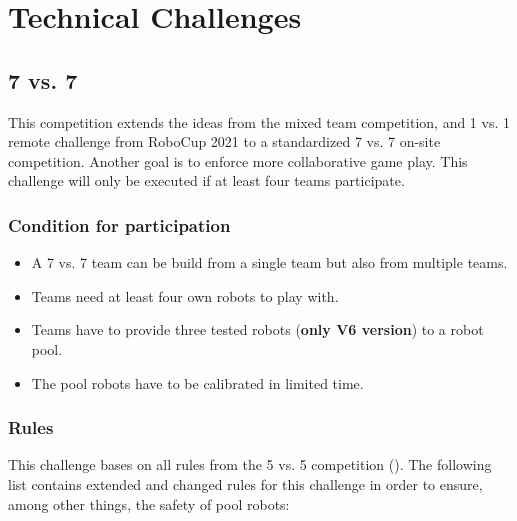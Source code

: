 \section{Technical Challenges}

\subsection{7 vs. 7}
    This competition extends the ideas from the mixed team competition, and 1 vs. 1 remote challenge from RoboCup 2021 to a standardized 7 vs. 7 on-site competition. Another goal is to enforce more collaborative game play. This challenge will only be executed if at least four teams participate.

    \subsubsection{Condition for participation}
    \label{sec:7vs7:condition_for_participation}
        \begin{itemize}
            \item A 7 vs. 7 team can be build from a single team but also from multiple teams.
            \item Teams need at least four own robots to play with.
            \item Teams have to provide three tested robots (\textbf{only V6 version}) to a robot pool.
            \item The pool robots have to be calibrated in limited time.
        \end{itemize}

    \subsubsection{Rules}
        This challenge bases on all rules from the 5 vs. 5 competition (). The following list contains extended and changed rules for this challenge in order to ensure, among other things, the safety of pool robots:

